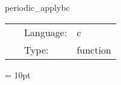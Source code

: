 \vspace{5mm}


\hspace{5mm} periodic\_applybc 

\hspace{5mm}{\it apply periodic boundary conditions } 


\hspace{5mm}

 \begin{tabular*}{160mm}{cll} 
~ & Language:  & c \\ 
~ & Type:  & function \\ 
\end{tabular*} 



\vspace{5mm}\parskip = 10pt 

